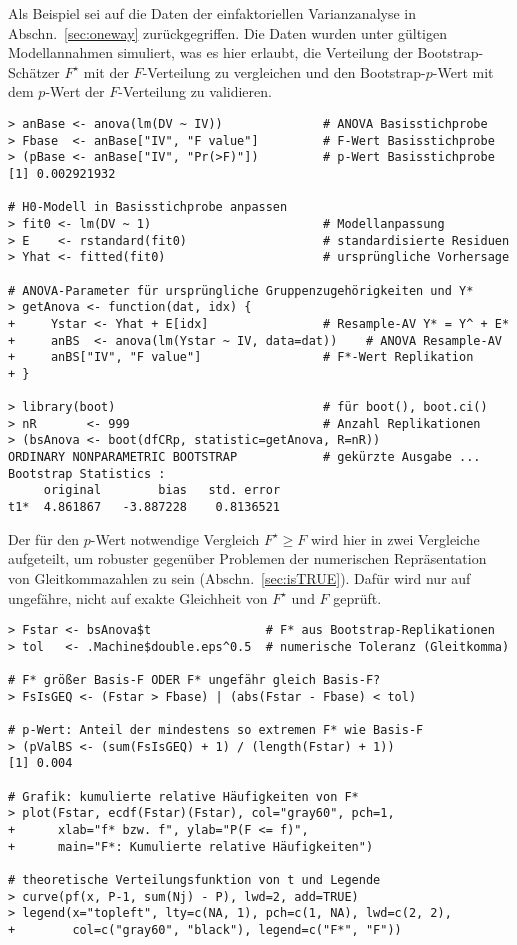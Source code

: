 Als Beispiel sei auf die Daten der einfaktoriellen Varianzanalyse in Abschn.\ \ref{sec:oneway} zurückgegriffen. Die Daten wurden unter gültigen Modellannahmen simuliert, was es hier erlaubt, die Verteilung der Bootstrap-Schätzer $F^{\star}$ mit der $F$-Verteilung zu vergleichen und den Bootstrap-$p$-Wert mit dem $p$-Wert der $F$-Verteilung zu validieren.
\begin{lstlisting}
> anBase <- anova(lm(DV ~ IV))              # ANOVA Basisstichprobe
> Fbase  <- anBase["IV", "F value"]         # F-Wert Basisstichprobe
> (pBase <- anBase["IV", "Pr(>F)"])         # p-Wert Basisstichprobe
[1] 0.002921932

# H0-Modell in Basisstichprobe anpassen
> fit0 <- lm(DV ~ 1)                        # Modellanpassung
> E    <- rstandard(fit0)                   # standardisierte Residuen
> Yhat <- fitted(fit0)                      # ursprüngliche Vorhersage

# ANOVA-Parameter für ursprüngliche Gruppenzugehörigkeiten und Y*
> getAnova <- function(dat, idx) {
+     Ystar <- Yhat + E[idx]                # Resample-AV Y* = Y^ + E*
+     anBS  <- anova(lm(Ystar ~ IV, data=dat))    # ANOVA Resample-AV
+     anBS["IV", "F value"]                 # F*-Wert Replikation
+ }

> library(boot)                             # für boot(), boot.ci()
> nR       <- 999                           # Anzahl Replikationen
> (bsAnova <- boot(dfCRp, statistic=getAnova, R=nR))
ORDINARY NONPARAMETRIC BOOTSTRAP            # gekürzte Ausgabe ...
Bootstrap Statistics :
     original        bias   std. error
t1*  4.861867   -3.887228    0.8136521
\end{lstlisting}

Der für den $p$-Wert notwendige Vergleich $F^{\star} \geq F$ wird hier in zwei Vergleiche aufgeteilt, um robuster gegenüber Problemen der numerischen Repräsentation von Gleitkommazahlen zu sein (Abschn.\ \ref{sec:isTRUE}). Dafür wird nur auf ungefähre, nicht auf exakte Gleichheit von $F^{\star}$ und $F$ geprüft.
\begin{lstlisting}
> Fstar <- bsAnova$t                # F* aus Bootstrap-Replikationen
> tol   <- .Machine$double.eps^0.5  # numerische Toleranz (Gleitkomma)

# F* größer Basis-F ODER F* ungefähr gleich Basis-F?
> FsIsGEQ <- (Fstar > Fbase) | (abs(Fstar - Fbase) < tol)

# p-Wert: Anteil der mindestens so extremen F* wie Basis-F
> (pValBS <- (sum(FsIsGEQ) + 1) / (length(Fstar) + 1))
[1] 0.004

# Grafik: kumulierte relative Häufigkeiten von F*
> plot(Fstar, ecdf(Fstar)(Fstar), col="gray60", pch=1,
+      xlab="f* bzw. f", ylab="P(F <= f)",
+      main="F*: Kumulierte relative Häufigkeiten")

# theoretische Verteilungsfunktion von t und Legende
> curve(pf(x, P-1, sum(Nj) - P), lwd=2, add=TRUE)
> legend(x="topleft", lty=c(NA, 1), pch=c(1, NA), lwd=c(2, 2),
+        col=c("gray60", "black"), legend=c("F*", "F"))
\end{lstlisting}

